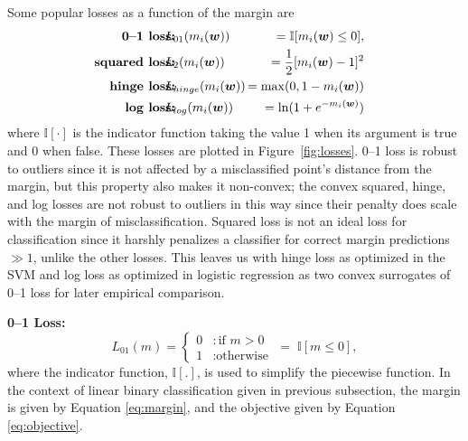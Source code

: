 Some popular losses as a function of the margin are
{\footnotesize
\begin{eqnarray}
\!\!\!\!\!\mbox{\bf 0--1 loss:} & \!\!\!\!\! L_{01}(m_i(\w))\!\!\!\!\! & = \mathbb{I} [m_i(\w) \leq 0], \label{eq:loss01} \\
\!\!\!\!\!\mbox{\bf squared loss:} & \!\!\!\!\! L_2(m_i(\w))\!\!\!\!\! &= \frac{1}{2}[m_i(\w) - 1]^2 \\
\!\!\!\!\!\mbox{\bf hinge loss:} & \!\!\!\!\! L_{hinge}(m_i(\w))\!\!\!\!\! &= \max(0, 1 - m_i(\w)) \\
\!\!\!\!\!\mbox{\bf log loss:} & \!\!\!\!\! L_{log}(m_i(\w))\!\!\!\!\! &= \ln (1 + e^{-m_i(\w)}) 
\end{eqnarray}}
where $\mathbb{I}[\cdot]$ is the indicator function taking the value 1
when its argument is true and 0 when false.  These losses are plotted
in Figure~\ref{fig:losses}.  0--1 loss is robust to outliers since it
is not affected by a misclassified point's distance from the margin,
but this property also makes it non-convex; the convex squared, hinge,
and log losses are not robust to outliers in this way since their
penalty does scale with the margin of misclassification.  Squared loss is
not an ideal loss for classification since it harshly penalizes a
classifier for correct margin predictions $\gg 1$, unlike the other
losses.  This leaves us with hinge loss as optimized in the SVM and
log loss as optimized in logistic regression as two convex surrogates
of 0--1 loss for later empirical comparison.


\COMMENT

{\bf 0--1 Loss:} 
\begin{equation}
L_{01}(m) = \left\{
     \begin{array}{ll}
       0 & : \text{if }m > 0\\
       1 & : \text{otherwise}
     \end{array}
   \right.
   \; = \; \mathbb{I} [m \leq 0], \label{eq:loss01}
\end{equation}
where the indicator function, $\mathbb{I} [.]$, is used to simplify
the piecewise function. In the context of linear binary classification
given in previous subsection, the margin is given by Equation
\ref{eq:margin}, and the objective given by Equation
\ref{eq:objective}.


